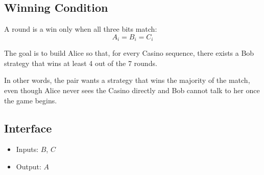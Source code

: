 \subsection*{Winning Condition}
A round is a win only when all three bits match:
\[
A_i = B_i = C_i
\]

The goal is to build Alice so that, for every Casino sequence, there exists a Bob strategy that wins at least 4 out of the 7 rounds.

In other words, the pair wants a strategy that wins the majority of the match, even though Alice never sees the Casino directly and Bob cannot talk to her once the game begins.

\subsection*{Interface}
\begin{itemize}
  \item Inputs: $B$, $C$
  \item Output: $A$
\end{itemize}

